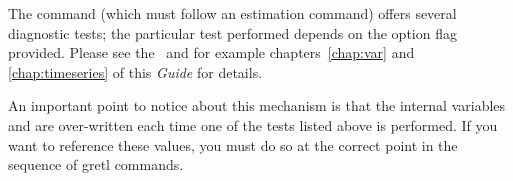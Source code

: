 The  command (which must follow an estimation
command) offers several diagnostic tests; the particular test
performed depends on the option flag provided. Please see the \GCR\
and for example chapters~\ref{chap:var} and \ref{chap:timeseries} of
this \textit{Guide} for details.

An important point to notice about this mechanism is that the internal
variables \dollar{test} and \dollar{pvalue} are over-written each time
one of the tests listed above is performed.  If you want to reference
these values, you must do so at the correct point in the sequence of
gretl commands.


